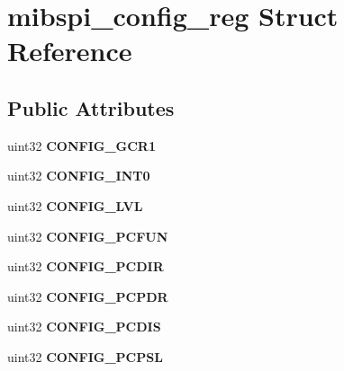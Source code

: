 \hypertarget{structmibspi__config__reg}{}\section{mibspi\+\_\+config\+\_\+reg Struct Reference}
\label{structmibspi__config__reg}
\subsection*{Public Attributes}
\begin{DoxyCompactItemize}
\item 
\mbox{\label{structmibspi__config__reg_a1b3841c162b7e38814f3d562e815b9ab}} 
uint32 {\bfseries C\+O\+N\+F\+I\+G\+\_\+\+G\+C\+R1}
\item 
\mbox{\label{structmibspi__config__reg_a5650d7125726eba410130c94e807763d}} 
uint32 {\bfseries C\+O\+N\+F\+I\+G\+\_\+\+I\+N\+T0}
\item 
\mbox{\label{structmibspi__config__reg_a934bff198fe0493720e851592a02b417}} 
uint32 {\bfseries C\+O\+N\+F\+I\+G\+\_\+\+L\+VL}
\item 
\mbox{\label{structmibspi__config__reg_a4416255b752b0fa262039bc30f9852ad}} 
uint32 {\bfseries C\+O\+N\+F\+I\+G\+\_\+\+P\+C\+F\+UN}
\item 
\mbox{\label{structmibspi__config__reg_ada02c846d30d10059c4ee2dd1c8bd33f}} 
uint32 {\bfseries C\+O\+N\+F\+I\+G\+\_\+\+P\+C\+D\+IR}
\item 
\mbox{\label{structmibspi__config__reg_a09f82de071c332f848178be9e63e5b6a}} 
uint32 {\bfseries C\+O\+N\+F\+I\+G\+\_\+\+P\+C\+P\+DR}
\item 
\mbox{\label{structmibspi__config__reg_ac41587abacc38aab08838aaccbf2ffef}} 
uint32 {\bfseries C\+O\+N\+F\+I\+G\+\_\+\+P\+C\+D\+IS}
\item 
\mbox{\label{structmibspi__config__reg_a72b0c15937951d2b9dfb788d725833f6}} 
uint32 {\bfseries C\+O\+N\+F\+I\+G\+\_\+\+P\+C\+P\+SL}

\end{DoxyCompactItemize}
